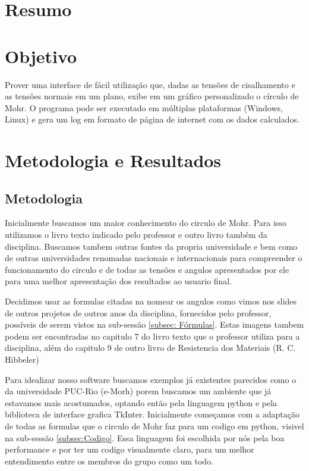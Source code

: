 \documentclass[a4paper]{article}
\begin{document}
\section{Resumo}

\section{Objetivo}
Prover uma interface de fácil utilização que, dadas as tensões de cisalhamento e as tensões normais em um plano, exibe em um gráfico personalizado o círculo de Mohr. O programa pode ser executado em múltiplas plataformas (Windows, Linux) e gera um log em formato de página de internet com os dados calculados. 

\section{Metodologia e Resultados}

\subsection{Metodologia}
Inicialmente buscamos um maior conhecimento do circulo de Mohr. Para isso utilizamos o livro texto indicado pelo professor e outro livro também da disciplina. Buscamos tambem outras fontes da propria universidade e bem como de outras universidades renomadas nacionais e internacionais para compreender o funcionamento do circulo e de todas as tensões e angulos apresentados por ele para uma melhor apresentação dos resultados ao usuario final.

Decidimos usar as formulas citadas na  nomear os angulos como vimos nos slides de outros projetos de outros anos da disciplina, fornecidos pelo professor, possíveis de serem vistos na sub-sessão \ref{subsec: Fórmulas}.
Estas imagens tambem podem ser encontradas no capitulo 7 do livro texto que o professor utiliza para a disciplina, além do capitulo 9 de outro livro de Resistencia dos Materiais (R. C. Hibbeler)

Para idealizar nosso software buscamos exemplos já  existentes parecidos como o da universidade PUC-Rio (e-Morh) porem buscamos um ambiente que já estavamos mais acostumados, optando então pela linguagem python e pela biblioteca de interface grafica TkInter. 
Inicialmente começamos com a adaptação de todas as formulas que o circulo de Mohr faz para um codigo em python, visivel na sub-sessão \ref{subsec:Codigo}. Essa linguagem foi escolhida por nós pela boa performance e por ter um codigo visualmente claro, para um melhor entendimento entre os membros do grupo como um todo.
\end{document}
